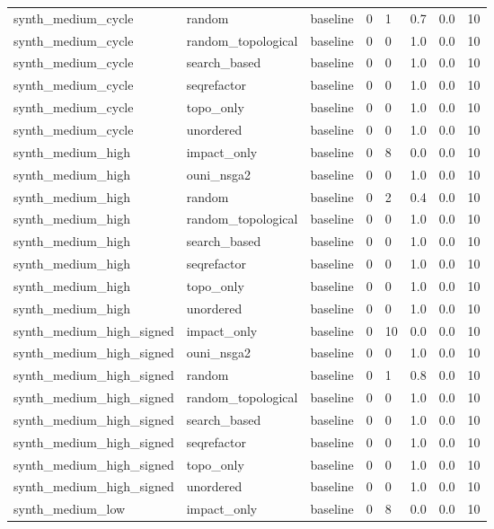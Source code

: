 \begin{table}[t]
\begin{tabular}{llllllll}
synth\_medium\_cycle & random & baseline & 0 & 1 & 0.7 & 0.0 & 10 \\
synth\_medium\_cycle & random\_topological & baseline & 0 & 0 & 1.0 & 0.0 & 10 \\
synth\_medium\_cycle & search\_based & baseline & 0 & 0 & 1.0 & 0.0 & 10 \\
synth\_medium\_cycle & seqrefactor & baseline & 0 & 0 & 1.0 & 0.0 & 10 \\
synth\_medium\_cycle & topo\_only & baseline & 0 & 0 & 1.0 & 0.0 & 10 \\
synth\_medium\_cycle & unordered & baseline & 0 & 0 & 1.0 & 0.0 & 10 \\
synth\_medium\_high & impact\_only & baseline & 0 & 8 & 0.0 & 0.0 & 10 \\
synth\_medium\_high & ouni\_nsga2 & baseline & 0 & 0 & 1.0 & 0.0 & 10 \\
synth\_medium\_high & random & baseline & 0 & 2 & 0.4 & 0.0 & 10 \\
synth\_medium\_high & random\_topological & baseline & 0 & 0 & 1.0 & 0.0 & 10 \\
synth\_medium\_high & search\_based & baseline & 0 & 0 & 1.0 & 0.0 & 10 \\
synth\_medium\_high & seqrefactor & baseline & 0 & 0 & 1.0 & 0.0 & 10 \\
synth\_medium\_high & topo\_only & baseline & 0 & 0 & 1.0 & 0.0 & 10 \\
synth\_medium\_high & unordered & baseline & 0 & 0 & 1.0 & 0.0 & 10 \\
synth\_medium\_high\_signed & impact\_only & baseline & 0 & 10 & 0.0 & 0.0 & 10 \\
synth\_medium\_high\_signed & ouni\_nsga2 & baseline & 0 & 0 & 1.0 & 0.0 & 10 \\
synth\_medium\_high\_signed & random & baseline & 0 & 1 & 0.8 & 0.0 & 10 \\
synth\_medium\_high\_signed & random\_topological & baseline & 0 & 0 & 1.0 & 0.0 & 10 \\
synth\_medium\_high\_signed & search\_based & baseline & 0 & 0 & 1.0 & 0.0 & 10 \\
synth\_medium\_high\_signed & seqrefactor & baseline & 0 & 0 & 1.0 & 0.0 & 10 \\
synth\_medium\_high\_signed & topo\_only & baseline & 0 & 0 & 1.0 & 0.0 & 10 \\
synth\_medium\_high\_signed & unordered & baseline & 0 & 0 & 1.0 & 0.0 & 10 \\
synth\_medium\_low & impact\_only & baseline & 0 & 8 & 0.0 & 0.0 & 10 \\

\end{tabular}
\end{table}
